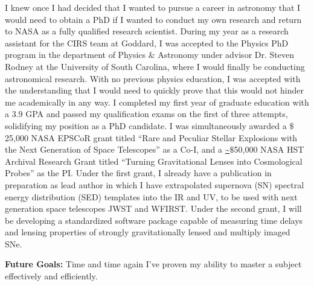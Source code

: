 I knew  once I  had decided that  I wanted to  pursue a  career in
astronomy that I would need to obtain a PhD if I wanted to conduct
my own research  and return to NASA as a  fully qualified research
scientist.  During  my year as  a research assistant for  the CIRS
team at Goddard, I was accepted  to the Physics PhD program in the
department  of Physics  $\&$ Astronomy  under advisor  Dr.  Steven
Rodney at the University of  South Carolina, where I would finally
be  conducting astronomical  research.  With  no previous  physics
education, I was accepted with the understanding that I would need
to quickly prove that this would not hinder me academically in any
way. I  completed my first year  of graduate education with  a 3.9
GPA  and passed  my  qualification  exams on  the  first of  three
attempts,  solidifying my  position  as a  PhD  candidate.  I  was
simultaneously awarded a $\$$25,000 NASA EPSCoR grant titled “Rare
and Peculiar Stellar Explosions with  the Next Generation of Space
Telescopes” as a Co-I, and a \url{~}$\$$50,000 NASA HST Archival Research
Grant  titled  “Turning  Gravitational  Lenses  into  Cosmological
Probes” as the PI. Under the first grant, I already have a publication
in preparation as lead author in which I have extrapolated supernova
(SN) spectral energy distribution (SED)  templates into the IR and
UV,  to be  used with  next generation  space telescopes  JWST and
WFIRST.   Under  the   second  grant,  I  will   be  developing  a
standardized software package capable of measuring time delays and
lensing properties of strongly gravitationally lensed and multiply
imaged SNe.

\textbf{Future Goals: }Time and time again  I’ve proven my ability to master
a subject effectively and efficiently.



